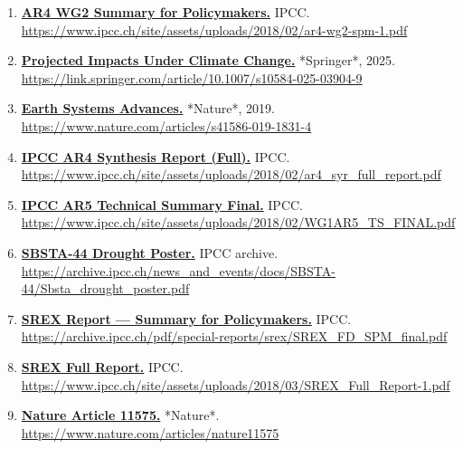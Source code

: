 \documentclass[
  10pt,
  a4paper,
  DIV=11,
  numbers=noendperiod,
  open=any]{scrreprt}
\numberwithin{equation}{chapter}
\numberwithin{equation}{section}
\renewcommand{\[}{\begin{equation}}
\renewcommand{\]}{\end{equation}}
\begin{document}
\begin{enumerate}
  \item \label{ref:web16}\href{https://www.ipcc.ch/site/assets/uploads/2018/02/ar4-wg2-spm-1.pdf}{\textbf{AR4 WG2 Summary for Policymakers.}} IPCC.  
  \url{https://www.ipcc.ch/site/assets/uploads/2018/02/ar4-wg2-spm-1.pdf}

  \item \label{ref:web17}\href{https://link.springer.com/article/10.1007/s10584-025-03904-9}{\textbf{Projected Impacts Under Climate Change.}} *Springer*, 2025.  
  \url{https://link.springer.com/article/10.1007/s10584-025-03904-9}

  \item \label{ref:web18}\href{https://www.nature.com/articles/s41586-019-1831-4}{\textbf{Earth Systems Advances.}} *Nature*, 2019.  
  \url{https://www.nature.com/articles/s41586-019-1831-4}

  \item \label{ref:web19}\href{https://www.ipcc.ch/site/assets/uploads/2018/02/ar4_syr_full_report.pdf}{\textbf{IPCC AR4 Synthesis Report (Full).}} IPCC.  
  \url{https://www.ipcc.ch/site/assets/uploads/2018/02/ar4_syr_full_report.pdf}

  \item \label{ref:web20}\href{https://www.ipcc.ch/site/assets/uploads/2018/02/WG1AR5_TS_FINAL.pdf}{\textbf{IPCC AR5 Technical Summary Final.}} IPCC.  
  \url{https://www.ipcc.ch/site/assets/uploads/2018/02/WG1AR5_TS_FINAL.pdf}

  \item \label{ref:web21}\href{https://archive.ipcc.ch/news_and_events/docs/SBSTA-44/Sbsta_drought_poster.pdf}{\textbf{SBSTA-44 Drought Poster.}} IPCC archive.  
  \url{https://archive.ipcc.ch/news_and_events/docs/SBSTA-44/Sbsta_drought_poster.pdf}

  \item \label{ref:web22}\href{https://archive.ipcc.ch/pdf/special-reports/srex/SREX_FD_SPM_final.pdf}{\textbf{SREX Report — Summary for Policymakers.}} IPCC.  
  \url{https://archive.ipcc.ch/pdf/special-reports/srex/SREX_FD_SPM_final.pdf}

  \item \label{ref:web23}\href{https://www.ipcc.ch/site/assets/uploads/2018/03/SREX_Full_Report-1.pdf}{\textbf{SREX Full Report.}} IPCC.  
  \url{https://www.ipcc.ch/site/assets/uploads/2018/03/SREX_Full_Report-1.pdf}

  \item \label{ref:web24}\href{https://www.nature.com/articles/nature11575}{\textbf{Nature Article 11575.}} *Nature*.  
  \url{https://www.nature.com/articles/nature11575}


\end{enumerate}
\end{document}

